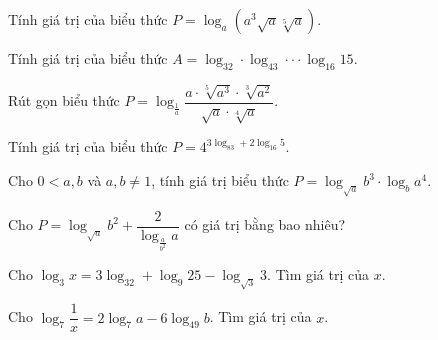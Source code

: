 \begin{bt}%
    Tính giá trị của biểu thức $P=\log_a \left( a^3 \sqrt{a}\sqrt[5]{a}\right)$.
\end{bt}
\begin{bt}%
  Tính giá trị của biểu thức $A=\log_32\cdot \log_43\cdot \cdot \cdot \log_{16}15$.
\end{bt}
\begin{bt}%
    Rút gọn biểu thức $P=\log_{\tfrac{1}{a}}\dfrac{a\cdot \sqrt[5]{a^3}\cdot \sqrt[3]{a^2}}{\sqrt{a}\cdot \sqrt[4]{a}}$.
\end{bt}
\begin{bt}%
   Tính giá trị của biểu thức $P=4^{3\log_83+2\log_{16}5}$. 
\end{bt}
\begin{bt}%
    Cho $0<a,b$ và $a,b \neq 1$, tính giá trị biểu thức $P=\log_{\sqrt{a}}b^3\cdot\log_ba^4$.
\end{bt}
\begin{bt}%
    Cho $P=\log_{\sqrt{a}}b^2+\dfrac{2}{\log_{\tfrac{a}{b^2}}a}$ có giá trị bằng bao nhiêu?
\end{bt}
\begin{bt}%
    Cho $\log_3x=3\log_32+\log_9 25-\log_{\sqrt{3}}3$. Tìm giá trị của $x$.
\end{bt}
\begin{bt}%
    Cho $\log_7\dfrac{1}{x}=2\log_7a-6\log_{49}b$. Tìm giá trị của $x$.
\end{bt}
